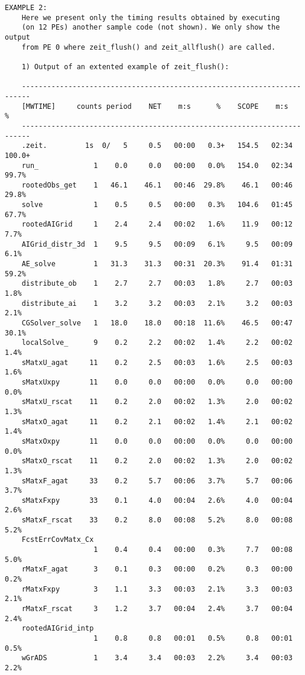 \begin{verbatim}
EXAMPLE 2:
    Here we present only the timing results obtained by executing 
    (on 12 PEs) another sample code (not shown). We only show the output 
    from PE 0 where zeit_flush() and zeit_allflush() are called.

    1) Output of an extented example of zeit_flush():

    ------------------------------------------------------------------------
    [MWTIME]     counts period    NET    m:s      %    SCOPE    m:s      %
    ------------------------------------------------------------------------
    .zeit.         1s  0/   5     0.5   00:00   0.3+   154.5   02:34 100.0+
    run_             1    0.0     0.0   00:00   0.0%   154.0   02:34  99.7%
    rootedObs_get    1   46.1    46.1   00:46  29.8%    46.1   00:46  29.8%
    solve            1    0.5     0.5   00:00   0.3%   104.6   01:45  67.7%
    rootedAIGrid     1    2.4     2.4   00:02   1.6%    11.9   00:12   7.7%
    AIGrid_distr_3d  1    9.5     9.5   00:09   6.1%     9.5   00:09   6.1%
    AE_solve         1   31.3    31.3   00:31  20.3%    91.4   01:31  59.2%
    distribute_ob    1    2.7     2.7   00:03   1.8%     2.7   00:03   1.8%
    distribute_ai    1    3.2     3.2   00:03   2.1%     3.2   00:03   2.1%
    CGSolver_solve   1   18.0    18.0   00:18  11.6%    46.5   00:47  30.1%
    localSolve_      9    0.2     2.2   00:02   1.4%     2.2   00:02   1.4%
    sMatxU_agat     11    0.2     2.5   00:03   1.6%     2.5   00:03   1.6%
    sMatxUxpy       11    0.0     0.0   00:00   0.0%     0.0   00:00   0.0%
    sMatxU_rscat    11    0.2     2.0   00:02   1.3%     2.0   00:02   1.3%
    sMatxO_agat     11    0.2     2.1   00:02   1.4%     2.1   00:02   1.4%
    sMatxOxpy       11    0.0     0.0   00:00   0.0%     0.0   00:00   0.0%
    sMatxO_rscat    11    0.2     2.0   00:02   1.3%     2.0   00:02   1.3%
    sMatxF_agat     33    0.2     5.7   00:06   3.7%     5.7   00:06   3.7%
    sMatxFxpy       33    0.1     4.0   00:04   2.6%     4.0   00:04   2.6%
    sMatxF_rscat    33    0.2     8.0   00:08   5.2%     8.0   00:08   5.2%
    FcstErrCovMatx_Cx
                     1    0.4     0.4   00:00   0.3%     7.7   00:08   5.0%
    rMatxF_agat      3    0.1     0.3   00:00   0.2%     0.3   00:00   0.2%
    rMatxFxpy        3    1.1     3.3   00:03   2.1%     3.3   00:03   2.1%
    rMatxF_rscat     3    1.2     3.7   00:04   2.4%     3.7   00:04   2.4%
    rootedAIGrid_intp
                     1    0.8     0.8   00:01   0.5%     0.8   00:01   0.5%
    wGrADS           1    3.4     3.4   00:03   2.2%     3.4   00:03   2.2%

\end{verbatim}
